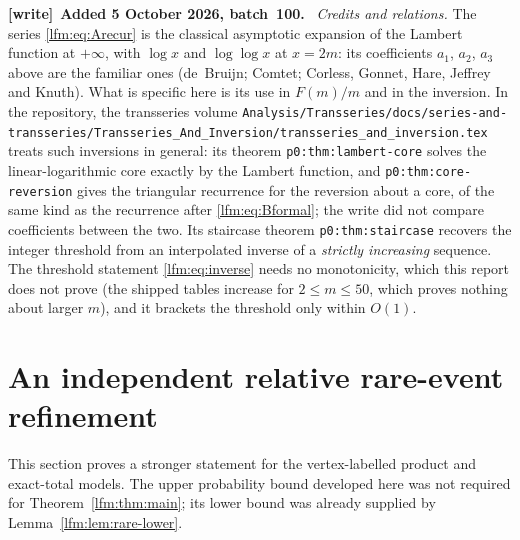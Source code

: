 \documentclass[11pt,letterpaper]{article}
\theoremstyle{remark}\newtheorem{remark}[theorem]{Remark}
\newenvironment{writenote}[1][]{\par\smallskip\begingroup\small
 \noindent\textbf{[write]}\if\relax\detokenize{#1}\relax\else~\textbf{#1.}\fi\ }%
 {\par\endgroup\smallskip}
\begin{document}
\begin{writenote}[Added 5 October 2026, batch~100]
\emph{Credits and relations.} The series \eqref{lfm:eq:Arecur} is the
classical asymptotic expansion of the Lambert function at $+\infty$, with
$\log x$ and $\log\log x$ at $x=2m$: its coefficients $a_1$, $a_2$, $a_3$
above are the familiar ones (de~Bruijn; Comtet; Corless, Gonnet, Hare,
Jeffrey and Knuth). What is specific here is its use in $F(m)/m$ and in the
inversion. In the repository, the transseries volume
\nolinkurl{Analysis/Transseries/docs/series-and-transseries/Transseries_And_Inversion/transseries_and_inversion.tex}
treats such inversions in general: its theorem \nolinkurl{p0:thm:lambert-core}
solves the linear-logarithmic core exactly by the Lambert function, and
\nolinkurl{p0:thm:core-reversion} gives the triangular recurrence for the
reversion about a core, of the same kind as the recurrence after
\eqref{lfm:eq:Bformal}; the write did not compare coefficients between the
two. Its staircase theorem \nolinkurl{p0:thm:staircase} recovers the integer
threshold from an interpolated inverse of a \emph{strictly increasing}
sequence. The threshold statement \eqref{lfm:eq:inverse} needs no
monotonicity, which this report does not prove (the shipped tables increase for
$2\le m\le50$, which proves nothing about larger $m$), and it brackets the
threshold only within $O(1)$.
\end{writenote}

\section{An independent relative rare-event refinement}\label{lfm:sec:star}
This section proves a stronger statement for the vertex-labelled product and exact-total models. The upper probability bound developed here was not required for Theorem~\ref{lfm:thm:main}; its lower bound was already supplied by Lemma~\ref{lfm:lem:rare-lower}.
\end{document}
